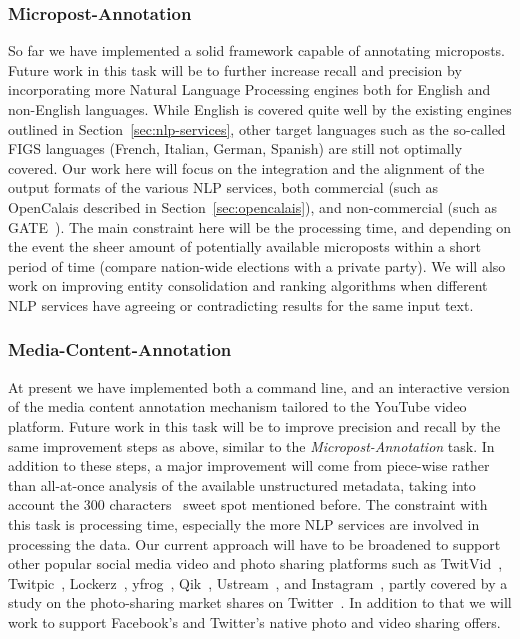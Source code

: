 \documentclass[12pt]{article}
\begin{document}
\subsubsection{Micropost-Annotation}
So far we have implemented a solid framework capable of annotating microposts. Future work in this task will be to further increase recall and precision by incorporating more Natural Language Processing engines both for English and non-English languages. While English is covered quite well by the existing engines outlined in Section~\ref{sec:nlp-services}, other target languages such as the so-called FIGS languages (French, Italian, German, Spanish) are still not optimally covered. Our work here will focus on the integration and the alignment of the output formats of the various NLP services, both commercial (such as OpenCalais described in Section~\ref{sec:opencalais}), and non-commercial (such as GATE~\cite{Cun02b}). The main constraint here will be the processing time, and depending on the event the sheer amount of potentially available microposts within a short period of time (compare nation-wide elections with a private party). We will also work on improving entity consolidation and ranking algorithms when different NLP services have agreeing or contradicting results for the same input text.

\subsubsection{Media-Content-Annotation}
At present we have implemented both a command line, and an interactive version of the media content annotation mechanism tailored to the YouTube video platform. Future work in this task will be to improve precision and recall by the same improvement steps as above, similar to the \emph{Micropost-Annotation} task. In addition to these steps, a major improvement will come from piece-wise rather than all-at-once analysis of the available unstructured metadata, taking into account the 300 characters~\cite{andraz} sweet spot mentioned before. The constraint with this task is processing time, especially the more NLP services are involved in processing the data. Our current approach will have to be broadened to support other popular social media video and photo sharing platforms such as TwitVid~\cite{twitvid}, Twitpic~\cite{twitpic}, Lockerz~\cite{lockerz}, yfrog~\cite{yfrog}, Qik~\cite{qik}, Ustream~\cite{ustream}, and Instagram~\cite{instagram}, partly covered by a study on the photo-sharing market shares on Twitter~\cite{techcrunch}. In addition to that we will work to support Facebook's and Twitter's native photo and video sharing offers.
\end{document}
